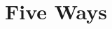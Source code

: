 \documentclass[a4paper]{dnd5}
\begin{document}
\section*{Five Ways}

\begin{precis}
\item 
\item 
\end{precis}


\begin{outs} 
\item 
\item 
\end{outs}

\begin{purpose}
\item 
\item 
\end{purpose}
     
\end{document}
